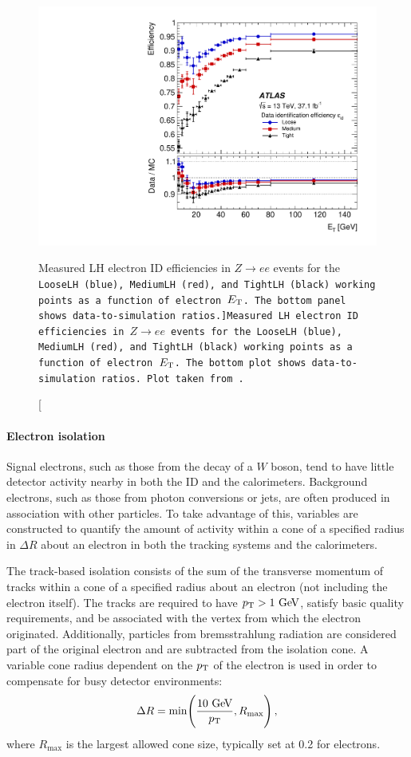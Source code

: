 \begin{figure}[htbp]
  \centering
  \includegraphics[width=.6\textwidth]{figs/detector/electron_id_efficiency}
  \caption[Measured LH electron ID efficiencies in $Z\rightarrow ee$ events for the \tt{LooseLH} (blue), \tt{MediumLH} (red), and \tt{TightLH} (black) working points as a function of electron $E_{\mathrm{T}}$. The bottom panel shows data-to-simulation ratios.]{Measured LH electron ID efficiencies in $Z\rightarrow ee$ events for the \tt{LooseLH} (blue), \tt{MediumLH} (red), and \tt{TightLH} (black) working points as a function of electron $E_{\mathrm{T}}$. The bottom plot shows data-to-simulation ratios. Plot taken from~\cite{2019.electron-reco-id}.}
  \label{fig:electron_id_efficiency}
\end{figure}

\paragraph*{Electron isolation}
Signal electrons, such as those from the decay of a $W$ boson, tend to have little detector activity nearby in both the ID and the calorimeters.
Background electrons, such as those from photon conversions or jets, are often produced in association with other particles.
To take advantage of this, variables are constructed to quantify the amount of activity within a cone of a specified radius in $\Delta R$ about an electron in both the tracking systems and the calorimeters.

The track-based isolation consists of the sum of the transverse momentum of tracks within a cone of a specified radius about an electron (not including the electron itself).
The tracks are required to have $\pt > 1\gev$, satisfy basic quality requirements, and be associated with the vertex from which the electron originated.
Additionally, particles from bremsstrahlung radiation are considered part of the original electron and are subtracted from the isolation cone.
A variable cone radius dependent on the $p_{\mathrm{T}}$ of the electron is used in order to compensate for busy detector environments:
\begin{equation}
  \Delta R = \mathrm{min}\Bigg(\frac{10\gev}{\pt},R_{\textrm{max}}\Bigg)\,,
  \label{eq:varcone}
\end{equation}
where $R_{\textrm{max}}$ is the largest allowed cone size, typically set at 0.2 for electrons.

